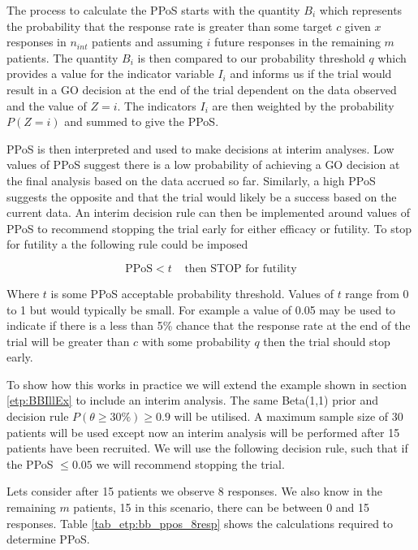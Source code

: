The process to calculate the PPoS starts with the quantity $B_i$ which represents the probability that the response rate is greater than some target $c$ given $x$ responses in $n_{int}$ patients and assuming $i$ future responses in the remaining $m$ patients. The quantity $B_i$ is then compared to our probability threshold $q$ which provides a value for the indicator variable $I_i$ and informs us if the trial would result in a GO decision at the end of the trial dependent on the data observed and the value of $Z=i$. The indicators $I_i$ are then weighted by the probability $P(Z=i)$ and summed to give the PPoS. 

PPoS is then interpreted and used to make decisions at interim analyses. Low values of PPoS suggest there is a low probability of achieving a GO decision at the final analysis based on the data accrued so far. Similarly, a high PPoS suggests the opposite and that the trial would likely be a success based on the current data. An interim decision rule can then be implemented around values of PPoS to recommend stopping the trial early for either efficacy or futility. To stop for futility a the following rule could be imposed 

\begin{equation}
	\text{PPoS} < t  \; \; \; \; \text{then STOP for futility}
\end{equation}

Where $t$ is some PPoS acceptable probability threshold. Values of $t$ range from 0 to 1 but would typically be small. For example a value of 0.05 may be used to indicate if there is a less than 5\% chance that the response rate at the end of the trial will be greater than $c$ with some probability $q$ then the trial should stop early. 

To show how this works in practice we will extend the example shown in section \ref{etp:BBIllEx} to include an interim analysis. The same Beta(1,1) prior and decision rule $P(\theta  \geq 30\%) \geq 0.9$ will be utilised. A maximum sample size of 30 patients will be used except now an interim analysis will be performed after 15 patients have been recruited. We will use the following decision rule, such that if the PPoS $\leq 0.05$ we will recommend stopping the trial. 

Lets consider after 15 patients we observe 8 responses. We also know in the remaining $m$ patients, 15 in this scenario, there can be between 0 and 15 responses. Table \ref{tab_etp:bb_ppos_8resp} shows the calculations required to determine PPoS. 

